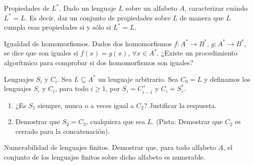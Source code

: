 \documentclass[12pt]{report} %
\begin{document}
\begin{ejercicio}
Propiedades de $L^*$. Dado un lenguaje $L$ sobre un alfabeto $A$, caracterizar cuándo $L^* = L$. Es decir, dar un conjunto de propiedades sobre $L$ de manera que $L$ cumpla esas propiedades si y sólo si $L^* = L$.
\end{ejercicio}

\begin{ejercicio}
Igualdad de homomorfismos. Dados dos homomorfismos $f : A^* \to B^*$, $g : A^* \to B^*$, se dice que son iguales si $f(x) = g(x)$, $\forall x \in A^*$. ¿Existe un procedimiento algorítmico para comprobar si dos homomorfismos son iguales?
\end{ejercicio}

\begin{ejercicio}
Lenguajes $S_i$ y $C_i$. 
Sea $L \subseteq A^*$ un lenguaje arbitrario. Sea $C_0 = L$ y definamos los lenguajes $S_i$ y $C_i$, para todo $i \geq 1$, por $S_i = C_{i-1}^+$ y $C_i = S_i^*$. 

\begin{enumerate}[label=\alph*)]
    \item ¿Es $S_1$ siempre, nunca o a veces igual a $C_2$? Justificar la respuesta.  

    \item Demostrar que $S_2 = C_3$, cualquiera que sea $L$. (Pista: Demostrar que $C_2$ es cerrado para la concatenación).
\end{enumerate}

\end{ejercicio}

\begin{ejercicio}
Numerabilidad de lenguajes finitos. Demostrar que, para todo alfabeto $A$, el conjunto de los lenguajes finitos sobre dicho alfabeto es numerable.
\end{ejercicio}


\end{document}
